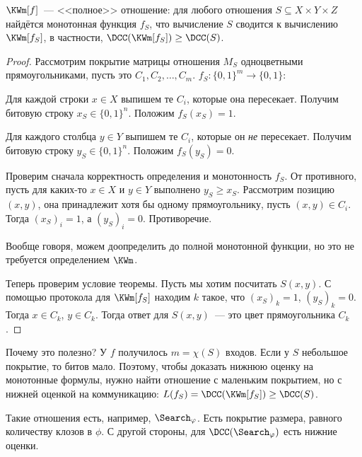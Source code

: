\begin{theorem}
    \label{KW is a complete relation}
    $\KWm[f]$~--- <<полное>> отношение: для любого отношения $S \subseteq X\times Y\times Z$ найдётся
    монотонная функция $f_S$, что вычисление $S$ сводится к вычислению $\KWm[f_S]$, в частности,
    $\DCC(\KWm[f_S]) \ge \DCC(S)$.
\end{theorem}

\begin{proof}
    Рассмотрим покрытие матрицы отношения $M_S$ одноцветными прямоугольниками, пусть это $C_1, C_2,
    \ldots, C_m$. $f_S\colon \{0, 1\}^m \to \{0, 1\}$:

    Для каждой строки $x\in X$ выпишем те $C_i$, которые она пересекает. Получим битовую строку $x_S \in
    \{0, 1\}^n$. Положим $f_S(x_S) = 1$.

    Для каждого столбца $y\in Y$ выпишем те $C_i$, которые он \emph{не} пересекает. Получим битовую
    строку $y_S \in \{0, 1\}^n$. Положим $f_S(y_S) = 0$.

    Проверим сначала корректность определения и монотонность $f_S$. От противного, пусть для каких-то
    $x\in X$ и $y\in Y$ выполнено $y_S \geqslant x_S$. Рассмотрим позицию $(x, y)$, она принадлежит хотя
    бы одному прямоугольнику, пусть $(x, y)\in C_i$. Тогда $(x_S)_i = 1$, а $(y_S)_i = 0$. Противоречие.

    Вообще говоря, можем доопределить до полной монотонной функции, но это не требуется определением
    $\KWm$.

    Теперь проверим условие теоремы. Пусть мы хотим посчитать $S(x, y)$. С помощью протокола для
    $\KWm[f_S]$ находим $k$ такое, что $(x_S)_k = 1$, $(y_S)_k = 0$. Тогда $x\in C_k$, $y\in
    C_k$. Тогда ответ для $S(x, y)$~--- это цвет прямоугольника $C_k$.

\end{proof}

Почему это полезно? У $f$ получилось $m = \chi(S)$ входов. Если у $S$ небольшое покрытие, то битов
мало. Поэтому, чтобы доказать нижнюю оценку на монотонные формулы, нужно найти отношение с маленьким
покрытием, но с нижней оценкой на коммуникацию: $L(f_S) = \DCC(\KWm[f_S]) \ge \DCC(S)$. 

Такие отношения есть, например, $\Search_{\varphi}$. Есть покрытие размера, равного количеству клозов в
$\phi$. С другой стороны, для $\DCC(\Search_{\varphi})$ есть нижние оценки.